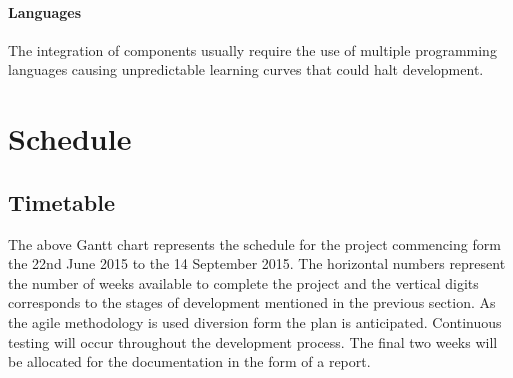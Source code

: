 \documentclass[a4paper, 11pt]{article}
\begin{document}
\paragraph{Languages}The integration of components usually require the use of multiple programming languages causing unpredictable learning curves that could halt development. 

\clearpage



\section{Schedule}

  \begin{gantt}{10}{12}
    \begin{ganttitle}
    \end{ganttitle}
  \end{gantt}
  

\subsection{Timetable}

The above Gantt chart represents the schedule for the project commencing form the 22nd June 2015 to the 14 September 2015. The horizontal numbers represent the number of weeks available to complete the project and the vertical digits corresponds to the stages of development mentioned in the previous section. As the agile methodology is used diversion form the plan is anticipated. Continuous testing will occur throughout the development process. The final two weeks will be allocated for the documentation in the form of a report. 

\vspace{\baselineskip}
\end{document}
